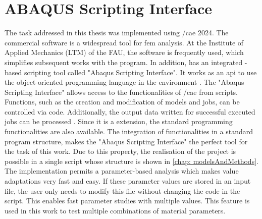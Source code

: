 \section{ABAQUS Scripting Interface} \label{sec: AbaqusBasics}

The task addressed in this thesis was implemented using /\acrshort{cae} 2024. The commercial software is a widespread tool for \acrshort{fem} analysis. At the Institute of Applied Mechanics (LTM) of the FAU, the software is frequently used, which simplifies subsequent works with the program. In addition,  has an integrated -based scripting tool called "Abaqus Scripting Interface". It works as an \acrfull{api} to use the object-oriented programming language  in the  environment \cite{dassault_systems_abaqus_2015-1}. The "Abaqus Scripting Interface" allows access to the functionalities of /\acrshort{cae} from scripts. Functions, such as the creation and modification of models and jobs, can be controlled via code. Additionally, the output data written for successful executed jobs can be processed \cite{dassault_systems_abaqus_2015-1}. Since it is a  extension, the standard programming functionalities are also available. The integration of  functionalities in a standard program structure, makes the "Abaqus Scripting Interface" the perfect tool for the task of this work. Due to this property, the realisation of the project is possible in a single script whose structure is shown in \autoref{chap: modelsAndMethods}. The implementation permits a parameter-based analysis which makes value adaptations very fast and easy. If these parameter values are stored in an input file, the user only needs to modify this file without changing the code in the script. This enables fast parameter studies with multiple values. This feature is used in this work to test multiple combinations of material parameters.  





